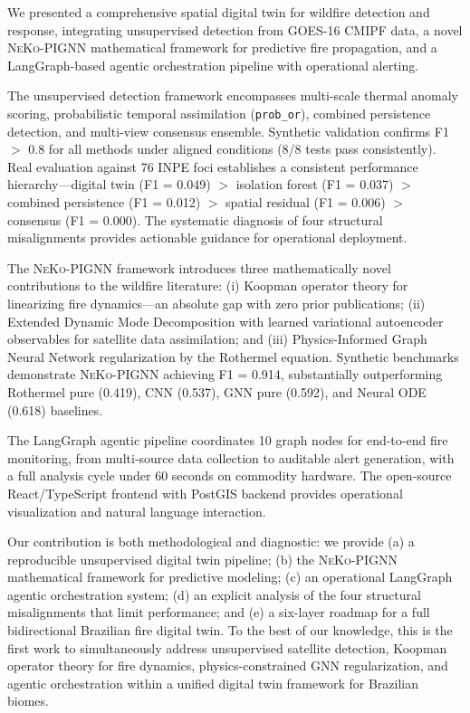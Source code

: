 \documentclass[5p,twocolumn]{elsarticle}
\newcommand{\code}[1]{\texttt{#1}}
\newcommand{\abbrev}[1]{{\small\textsc{#1}}}
\begin{document}
We presented a comprehensive spatial digital twin for wildfire detection and response, integrating unsupervised detection from \abbrev{GOES-16} \abbrev{CMIPF} data, a novel \abbrev{NeKo-PIGNN} mathematical framework for predictive fire propagation, and a LangGraph-based agentic orchestration pipeline with operational alerting.

The unsupervised detection framework encompasses multi-scale thermal anomaly scoring, probabilistic temporal assimilation (\code{prob\_or}), combined persistence detection, and multi-view consensus ensemble. Synthetic validation confirms F1 $>$ 0.8 for all methods under aligned conditions (8/8 tests pass consistently). Real evaluation against 76 \abbrev{INPE} foci establishes a consistent performance hierarchy---digital twin (F1 = 0.049) $>$ isolation forest (F1 = 0.037) $>$ combined persistence (F1 = 0.012) $>$ spatial residual (F1 = 0.006) $>$ consensus (F1 = 0.000). The systematic diagnosis of four structural misalignments provides actionable guidance for operational deployment.

The \abbrev{NeKo-PIGNN} framework introduces three mathematically novel contributions to the wildfire literature: (i) Koopman operator theory for linearizing fire dynamics---an absolute gap with zero prior publications; (ii) Extended Dynamic Mode Decomposition with learned variational autoencoder observables for satellite data assimilation; and (iii) Physics-Informed Graph Neural Network regularization by the Rothermel equation. Synthetic benchmarks demonstrate \abbrev{NeKo-PIGNN} achieving F1 = 0.914, substantially outperforming Rothermel pure (0.419), CNN (0.537), GNN pure (0.592), and Neural ODE (0.618) baselines.

The LangGraph agentic pipeline coordinates 10 graph nodes for end-to-end fire monitoring, from multi-source data collection to auditable alert generation, with a full analysis cycle under 60 seconds on commodity hardware. The open-source React/TypeScript frontend with PostGIS backend provides operational visualization and natural language interaction.

Our contribution is both methodological and diagnostic: we provide (a) a reproducible unsupervised digital twin pipeline; (b) the \abbrev{NeKo-PIGNN} mathematical framework for predictive modeling; (c) an operational LangGraph agentic orchestration system; (d) an explicit analysis of the four structural misalignments that limit performance; and (e) a six-layer roadmap for a full bidirectional Brazilian fire digital twin. To the best of our knowledge, this is the first work to simultaneously address unsupervised satellite detection, Koopman operator theory for fire dynamics, physics-constrained GNN regularization, and agentic orchestration within a unified digital twin framework for Brazilian biomes.
\end{document}
